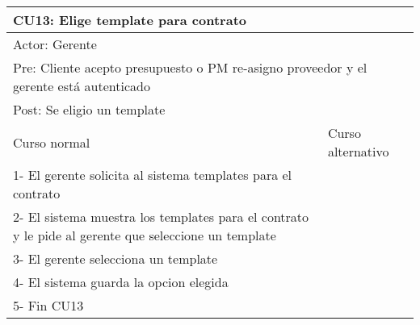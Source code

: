 \begin{table}[H]
  \begin{adjustbox}{max width = \textwidth}
  \begin{tabular}{|l|l|}
    \hline
    \multicolumn{2}{|l|}{CU13: Elige template para contrato} \\\hline
    \multicolumn{2}{|l|}{Actor: Gerente} \\\hline
    \multicolumn{2}{|l|}{Pre: Cliente acepto presupuesto o PM re-asigno proveedor y el gerente está autenticado} \\\hline
    \multicolumn{2}{|l|}{Post: Se eligio un template} \\\hline
     Curso normal & Curso alternativo\\ \hline
     1- El gerente solicita al sistema templates para el contrato & \\ \hline
     2- El sistema muestra los templates para el contrato y le pide al gerente que seleccione un template & \\ \hline
     3- El gerente selecciona un template & \\ \hline
	 4- El sistema guarda la opcion elegida & \\ \hline
     5- Fin CU13 & \\ \hline
  \end{tabular}
  \end{adjustbox}
\end{table}


